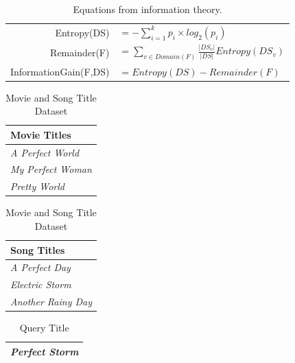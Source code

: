 \documentclass[--SOLUTION-OPTION--]{ditpaper}
\begin{document}
	\begin{table}[htb]
	\begin{center}
	\begin{tabular}{rl}
	Entropy(DS) & $= -\sum_{i=1}^k p_i \times log_2(p_i)$\\
	Remainder(F) & $=\sum_{v \in Domain(F)} \frac{|DS_v|}{|DS|} Entropy(DS_v)$\\
	InformationGain(F,DS) & $=Entropy(DS)-Remainder(F)$\\
	\end{tabular}
	\end{center}
	\caption{Equations from information theory.}
	\label{tab:info-eqs}
	\end{table}
\newpage
	
\begin{table}[!htb]
    \caption{Movie and Song Title Dataset}
    \begin{minipage}{.5\linewidth}
      \centering
\begin{tabular}{l}
\textbf{Movie Titles}\\
\hline
\textit{A Perfect World}\\
\textit{My Perfect Woman}\\
\textit{Pretty World}\\
\hline
\end{tabular}
    \end{minipage}%
    \begin{minipage}{.5\linewidth}
      \centering
\begin{tabular}{l}
\textbf{Song Titles}\\
\hline
\textit{A Perfect Day}\\
\textit{Electric Storm}\\
\textit{Another Rainy Day}\\
\hline
\end{tabular}
    \end{minipage} 
    \label{tab:songmoviedata}
\end{table}

\begin{table}[h]
\caption{Query Title}
\centering
\begin{tabular}{l}
\hline
\textit{Perfect Storm}\\
\hline
\end{tabular}
\label{tab:songmoviequery}
\end{table}
\end{document}

